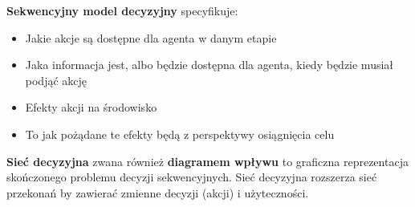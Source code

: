 \documentclass[a4paper, 12pt,oneside]{book}
\begin{document}
\textbf{Sekwencyjny model decyzyjny} specyfikuje:
\begin{itemize}
	\setlength\itemsep{-0.4em}
	\item Jakie akcje są dostępne dla agenta w danym etapie
	\item Jaka informacja jest, albo będzie dostępna dla agenta, kiedy
		będzie musiał podjąć akcję
	\item Efekty akcji na środowisko
	\item To jak pożądane te efekty będą z perspektywy osiągnięcia celu
\end{itemize}

\textbf{Sieć decyzyjna} zwana również \textbf{diagramem wpływu} to graficzna
reprezentacja skończonego problemu decyzji
sekwencyjnych\cite{ai_foundations_decision_networks}. Sieć decyzyjna
rozszerza sieć przekonań by zawierać zmienne decyzji (akcji) i użyteczności.
\end{document}
